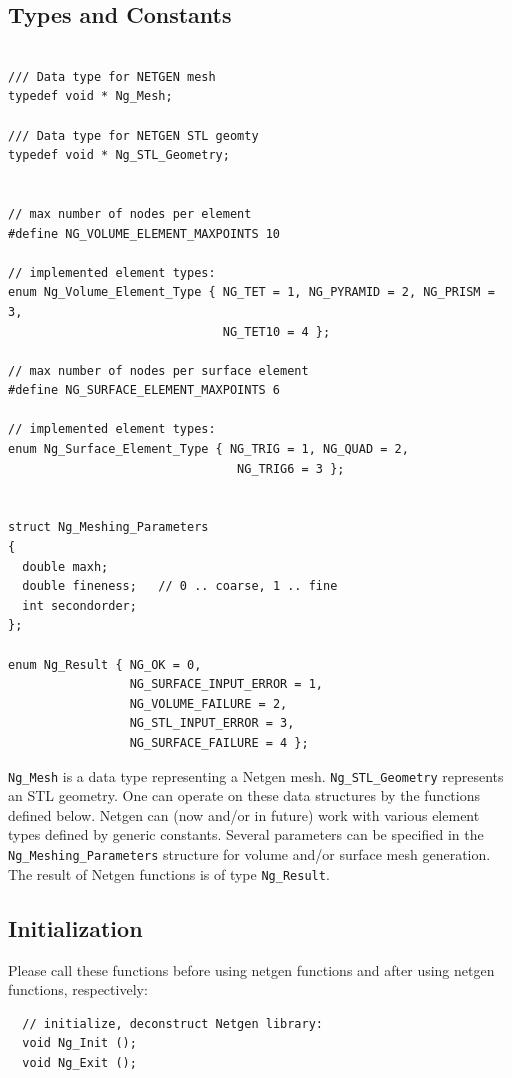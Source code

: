 \documentclass[12pt]{book}
\begin{document}
\subsection{Types and Constants}
\begin{verbatim}

/// Data type for NETGEN mesh
typedef void * Ng_Mesh;

/// Data type for NETGEN STL geomty
typedef void * Ng_STL_Geometry;


// max number of nodes per element
#define NG_VOLUME_ELEMENT_MAXPOINTS 10

// implemented element types:
enum Ng_Volume_Element_Type { NG_TET = 1, NG_PYRAMID = 2, NG_PRISM = 3,
                              NG_TET10 = 4 };

// max number of nodes per surface element
#define NG_SURFACE_ELEMENT_MAXPOINTS 6

// implemented element types:
enum Ng_Surface_Element_Type { NG_TRIG = 1, NG_QUAD = 2, 
                                NG_TRIG6 = 3 };


struct Ng_Meshing_Parameters 
{
  double maxh;
  double fineness;   // 0 .. coarse, 1 .. fine
  int secondorder;
};

enum Ng_Result { NG_OK = 0, 
                 NG_SURFACE_INPUT_ERROR = 1,
                 NG_VOLUME_FAILURE = 2, 
                 NG_STL_INPUT_ERROR = 3,
                 NG_SURFACE_FAILURE = 4 };
\end{verbatim}


{\tt Ng\_Mesh} is a data type representing a Netgen mesh. {\tt Ng\_STL\_Geometry}
represents an STL geometry. One can operate on these data structures by
the functions defined below. Netgen can (now and/or in future) work with
various element types defined by generic constants. Several parameters
can be specified in the {\tt Ng\_Meshing\_Parameters} structure for 
volume and/or surface mesh generation. The result of Netgen functions
is of type {\tt Ng\_Result}.



\subsection{Initialization}
Please call these functions before using netgen functions and after
using netgen functions, respectively:
\begin{verbatim}
  // initialize, deconstruct Netgen library:
  void Ng_Init ();
  void Ng_Exit ();
\end{verbatim}
\end{document}
